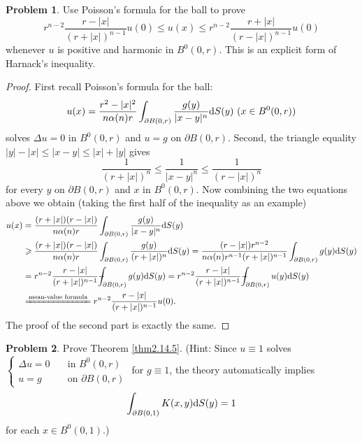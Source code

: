 \documentclass[hyperref,UTF8,12pt]{article}
\numberwithin{equation}{subsection}
\theoremstyle{plain}
\theoremstyle{definition}
\newtheorem{problem}{Problem}
\numberwithin{theorem}{section}
\numberwithin{lemma}{section}
\numberwithin{proposition}{section}
\numberwithin{remark}{section}
\numberwithin{corollary}{section}
\numberwithin{definition}{section}
\numberwithin{problem}{section}
\numberwithin{example}{section}
\def\dif{\textup{d}}
\def\Xint#1{\mathchoice
	{\XXint\displaystyle\textstyle{#1}}%
	{\XXint\textstyle\scriptstyle{#1}}%
	{\XXint\scriptstyle\scriptscriptstyle{#1}}%
	{\XXint\scriptscriptstyle\scriptscriptstyle{#1}}%
	\!\int}
\def\XXint#1#2#3{{\setbox0=\hbox{$#1{#2#3}{\int}$ }
		\vcenter{\hbox{$#2#3$ }}\kern-.55\wd0}}
\def\dashint{\Xint-}
\newcommand{\ptl}{\partial}
\renewcommand{\leq}{\leqslant}
\renewcommand{\geq}{\geqslant}
\begin{document}
\begin{problem}
Use Poisson's formula for the ball to prove
\[r^{n-2}\frac{r-|x|}{(r+|x|)^{n-1}}u(0)\leq u(x)\leq r^{n-2}\frac{r+|x|}{(r-|x|)^{n-1}}u(0)\]
whenever $u$ is positive and harmonic in $B^0(0,r)$. This is an explicit form of Harnack's inequality.
\end{problem}
\begin{proof}
First recall Poisson's formula for the ball:\[u(x)=\frac{r^2-|x|^2}{n\alpha(n)r}\int_{\ptl B(0,r)} \frac{g(y)}{|x-y|^n}\dif S(y)~(x\in B^0(0,r))\]solves $\Delta u=0$ in $B^0(0,r)$ and $u=g$ on $\partial B(0,r)$. Second, the triangle equality $|y|-|x|\leq|x-y|\leq|x|+|y|$ gives \[\frac{1}{(r+|x|)^n} \leq\frac{1}{|x-y|^n}\leq\frac{1}{(r-|x|)^n}\]for every $y$ on $\ptl B(0,r)$ and $x$ in $B^0(0,r)$. Now combining the two equations above we obtain (taking the first half of the inequality as an example)\[\begin{aligned}
	u(x)&=\frac{(r+|x|)(r-|x|)}{n\alpha(n)r}\int_{\ptl B(0,r)}\frac{g(y)}{|x-y|^n}\dif S(y)\\
	&\geq\frac{(r+|x|)(r-|x|)}{n\alpha(n)r}\int_{\ptl B(0,r)}\frac{g(y)}{(r+|x|)^n}\dif S(y)=\frac{(r-|x|)r^{n-2}}{n\alpha(n)r^{n-1}(r+|x|)^{n-1}}\int_{\ptl B(0,r)}g(y)\dif S(y)\\
	&=r^{n-2}\frac{r-|x|}{(r+|x|)^{n-1}}\dashint_{\ptl B(0,r)}g(y)\dif S(y)=r^{n-2}\frac{r-|x|}{(r+|x|)^{n-1}}\dashint_{\ptl B(0,r)}u(y)\dif S(y)\\
	&\xlongequal{\text{mean-value formula}}r^{n-2}\frac{r-|x|}{(r+|x|)^{n-1}}u(0).
\end{aligned}\]The proof of the second part is exactly the same.
\end{proof}
\begin{problem}
Prove Theorem \ref{thm2.14.5}. (Hint: Since $u\equiv1$ solves $\left\{\begin{aligned} \Delta u=0 &\quad\text{in } B^0(0,r)\\ u=g &\quad\text{on } \ptl B(0,r)\end{aligned}\right.$ for $g\equiv1$, the theory automatically implies
\[\int_{\ptl B(0,1)}K(x,y)\dif S(y)=1\]for each $x\in B^0(0,1)$.)
\end{problem}
\end{document}
